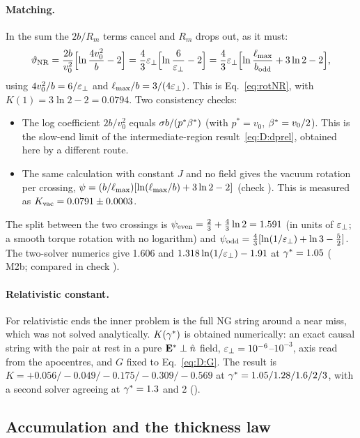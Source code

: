 \paragraph{Matching.} In the sum the $2b/R_m$ terms cancel and $R_m$ drops out, as it must:
\begin{equation}
  \vartheta_{\rm NR}=\frac{2b}{v_0^2}\Bigl[\ln\frac{4v_0^2}{b}-2\Bigr]
  =\frac43\varepsilon_\perp\Bigl[\ln\frac{6}{\varepsilon_\perp}-2\Bigr]
  =\frac43\varepsilon_\perp\Bigl[\ln\frac{\ell_{\max}}{b_{\rm odd}}+3\ln2-2\Bigr],
  \label{eq:D:rotNR}
\end{equation}
using $4v_0^2/b=6/\varepsilon_\perp$ and $\ell_{\max}/b=3/(4\varepsilon_\perp)$. This is Eq.~\eqref{eq:rotNR}, with $K(1)=3\ln2-2=0.0794$. Two
consistency checks:
\begin{itemize}
\item The log coefficient $2b/v_0^2$ equals $\sigma b/(p^*\beta^*)$ (with $p^*=v_0$, $\beta^*=v_0/2$). This is the slow-end
  limit of the intermediate-region result~\eqref{eq:D:dprel}, obtained here by a different route.
\item The same calculation with constant $J$ and no field gives the vacuum rotation per crossing,
  $\psi=(b/\ell_{\max})[\ln(\ell_{\max}/b)+3\ln2-2]$ (check ). This is measured as $K_{\rm vac}=0.0791\pm0.0003$.
\end{itemize}
The split between the two crossings is $\psi_{\rm even}=\tfrac23+\tfrac43\ln2=1.591$ (in units of $\varepsilon_\perp$; a smooth
torque rotation with no logarithm) and $\psi_{\rm odd}=\tfrac43[\ln(1/\varepsilon_\perp)+\ln3-\tfrac52]$. The two-solver numerics give
1.606 and $1.318\ln(1/\varepsilon_\perp)-1.91$ at $\gamma^*=1.05$ ( M2b; compared in check ).

\paragraph{Relativistic constant.} For relativistic ends the inner problem is the full NG string around a near miss,
which was not solved analytically. $K(\gamma^*)$ is obtained numerically: an exact causal string with the pair at rest in a
pure $\mathbf{E}^*\perp\hat n$ field, $\varepsilon_\perp=10^{-6}$--$10^{-3}$, axis read from the apocentres, and $G$ fixed to
Eq.~\eqref{eq:D:G}. The result is $K=+0.056/-0.049/-0.175/-0.309/-0.569$ at $\gamma^*=1.05/1.28/1.6/2/3$, with a second
solver agreeing at $\gamma^*=1.3$ and 2 (\EST{}).

\subsection{Accumulation and the thickness law}\label{app:der:law}
